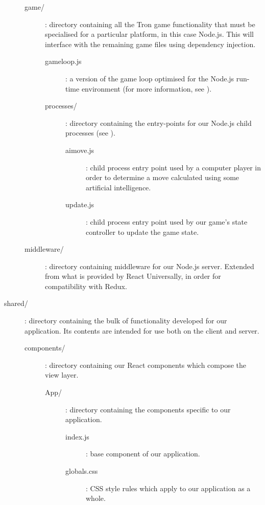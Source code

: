 \documentclass{standalone}
\begin{document}
\begin{formal}
\begin{description}
\begin{description}
		        	\item[game/]: directory containing all the Tron game functionality that must be specialised for a particular platform, in this case Node.js. This will interface with the remaining game files using dependency injection.
		        	\begin{description}
			        	\item[gameloop.js]: a version of the game loop optimised for the Node.js run-time environment (for more information, see ).

			        	\item[processes/]: directory containing the entry-points for our Node.js child processes (see ).
		        		\begin{description}
				        	\item[aimove.js]: child process entry point used by a computer player in order to determine a move calculated using some artificial intelligence.
				        	\item[update.js]: child process entry point used by our game's state controller to update the game state.
				      	\end{description}
			      	\end{description}

		        	\item[middleware/]: directory containing middleware for our Node.js server. Extended from what is provided by React Universally, in order for compatibility with Redux.
		      	\end{description}

	      	\item[shared/]: directory containing the bulk of functionality developed for our application. Its contents are intended for use both on the client and server.
        		\begin{description}
		        	\item[components/]: directory containing our React components which compose the view layer.
		        	\begin{description}
		        		\item[App/]: directory containing the components specific to our application.
				      	\begin{description}
		        			\item[index.js]: base component of our application.
		        			\item[globals.css]: CSS style rules which apply to our application as a whole.


\end{description}
\end{description}
\end{description}
\end{description}
\end{formal}
\end{document}

